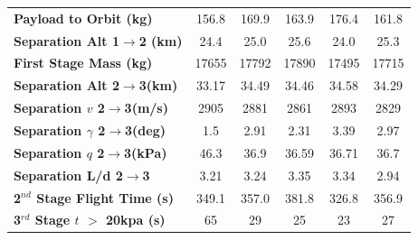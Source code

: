 \documentclass[]{aiaa-tc}
\newcommand{\FirstStageAltConstq}{24.4}
\newcommand{\FirstStageAltFifty}{25.0}
\newcommand{\FirstStageAltFortyFive}{25.6}
\newcommand{\FirstStageAltFiftyFive}{24.0}
\newcommand{\FirstStageAltHighDrag}{25.3}
\newcommand{\FirstStagemConstq}{17655}
\newcommand{\FirstStagemFifty}{17792}
\newcommand{\FirstStagemFortyFive}{17890}
\newcommand{\FirstStagemFiftyFive}{17495}
\newcommand{\FirstStagemHighDrag}{17715}
\newcommand{\PayloadToOrbitConstq}{156.8}
\newcommand{\PayloadToOrbitFiftykPa}{169.9}
\newcommand{\PayloadToOrbitFortyFivekPa}{163.9}
\newcommand{\PayloadToOrbitFiftyFivekPa}{176.4}
\newcommand{\PayloadToOrbitHighDrag}{161.8}
\newcommand{\SeparationAltConstq}{33.17}
\newcommand{\SeparationAltFiftykPa}{34.49}
\newcommand{\SeparationAltFortyFivekPa}{34.46}
\newcommand{\SeparationAltFiftyFivekPa}{34.58}
\newcommand{\SeparationAltHighDrag}{34.29}
\newcommand{\SeparationvConstq}{2905}
\newcommand{\SeparationvFiftykPa}{2881}
\newcommand{\SeparationvFortyFivekPa}{2861}
\newcommand{\SeparationvFiftyFivekPa}{2893}
\newcommand{\SeparationvHighDrag}{2829}
\newcommand{\SeparationAngleConstq}{1.5}
\newcommand{\SeparationAngleFiftykPa}{2.91}
\newcommand{\SeparationAngleFortyFivekPa}{2.31}
\newcommand{\SeparationAngleFiftyFivekPa}{3.39}
\newcommand{\SeparationAngleHighDrag}{2.97}
\newcommand{\SeparationqConstq}{46.3}
\newcommand{\SeparationqFiftykPa}{36.9}
\newcommand{\SeparationqFortyFivekPa}{36.59}
\newcommand{\SeparationqFiftyFivekPa}{36.71}
\newcommand{\SeparationqHighDrag}{36.7}
\newcommand{\SeparationLDConstq}{3.21}
\newcommand{\SeparationLDFiftykPa}{3.24}
\newcommand{\SeparationLDFortyFivekPa}{3.35}
\newcommand{\SeparationLDFiftyFivekPa}{3.34}
\newcommand{\SeparationLDHighDrag}{2.94}
\newcommand{\FlightTimeConstq}{349.1}
\newcommand{\FlightTimeFiftykPa}{357.0}
\newcommand{\FlightTimeFortyFivekPa}{381.8}
\newcommand{\FlightTimeFiftyFivekPa}{326.8}
\newcommand{\FlightTimeHighDrag}{356.9}
\newcommand{\toverConstq}{65}
\newcommand{\toverFiftykPa}{29}
\newcommand{\toverFortyFivekPa}{25}
\newcommand{\toverFiftyFivekPa}{23}
\newcommand{\toverHighDrag}{27}
\begin{document}
\begin{table}[htb]
\begin{tabular}{l c c c c c}
		\hline \textbf{Payload to Orbit (kg)}  & \PayloadToOrbitConstq & \PayloadToOrbitFiftykPa & \PayloadToOrbitFortyFivekPa & \PayloadToOrbitFiftyFivekPa & \PayloadToOrbitHighDrag \\ 
		\textbf{Separation Alt 1$\rightarrow$2 (km)}  & \FirstStageAltConstq & \FirstStageAltFifty & \FirstStageAltFortyFive &  \FirstStageAltFiftyFive &\FirstStageAltHighDrag \\ 
		\textbf{First Stage Mass (kg)} & \FirstStagemConstq & \FirstStagemFifty &  \FirstStagemFortyFive& \FirstStagemFiftyFive  & \FirstStagemHighDrag\\ 
		 \textbf{Separation Alt 2$\rightarrow$3(km)}  & \SeparationAltConstq & \SeparationAltFiftykPa & \SeparationAltFortyFivekPa & \SeparationAltFiftyFivekPa & \SeparationAltHighDrag\\ 
		 \textbf{Separation $v$ 2$\rightarrow$3(m/s)} & \SeparationvConstq  & \SeparationvFiftykPa & \SeparationvFortyFivekPa &  \SeparationvFiftyFivekPa & \SeparationvHighDrag\\ 
		 \textbf{Separation $\gamma$ 2$\rightarrow$3(deg)} & \SeparationAngleConstq& \SeparationAngleFiftykPa &\SeparationAngleFortyFivekPa& \SeparationAngleFiftyFivekPa&\SeparationAngleHighDrag \\ 
		 \textbf{Separation $q$ 2$\rightarrow$3(kPa)} & \SeparationqConstq  &\SeparationqFiftykPa&\SeparationqFortyFivekPa &\SeparationqFiftyFivekPa& \SeparationqHighDrag \\ 
		 \textbf{Separation L/d 2$\rightarrow$3} & \SeparationLDConstq&\SeparationLDFiftykPa & \SeparationLDFortyFivekPa & \SeparationLDFiftyFivekPa &\SeparationLDHighDrag\\
		 \textbf{2$^{nd}$ Stage Flight Time (s)} & \FlightTimeConstq & \FlightTimeFiftykPa & \FlightTimeFortyFivekPa & \FlightTimeFiftyFivekPa & \FlightTimeHighDrag\\ 
		 \textbf{3$^{rd}$ Stage $t$ $>$ 20kpa (s)} &\toverConstq &\toverFiftykPa &\toverFortyFivekPa &\toverFiftyFivekPa & \toverHighDrag\\ 
		 
		 
		\hline 
	\end{tabular} 


	\label{table:Summary}
\end{table}
\end{document}
